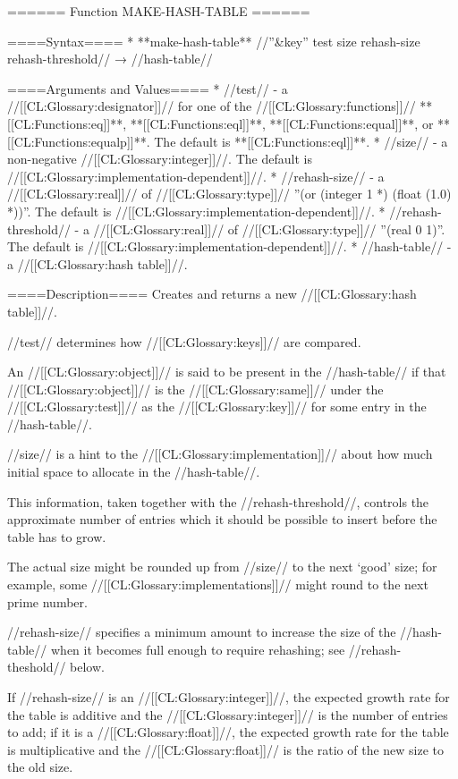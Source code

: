 ====== Function MAKE-HASH-TABLE ======

====Syntax====
  * **make-hash-table** //''&key'' test size rehash-size rehash-threshold// → //hash-table//

====Arguments and Values====
  * //test// - a //[[CL:Glossary:designator]]// for one of the //[[CL:Glossary:functions]]// **[[CL:Functions:eq]]**, **[[CL:Functions:eql]]**, **[[CL:Functions:equal]]**, or **[[CL:Functions:equalp]]**. The default is **[[CL:Functions:eql]]**.
  * //size// - a non-negative //[[CL:Glossary:integer]]//. The default is //[[CL:Glossary:implementation-dependent]]//.
  * //rehash-size// - a //[[CL:Glossary:real]]// of //[[CL:Glossary:type]]// ''(or (integer 1 *) (float (1.0) *))''. The default is //[[CL:Glossary:implementation-dependent]]//.
  * //rehash-threshold// - a //[[CL:Glossary:real]]// of //[[CL:Glossary:type]]// ''(real 0 1)''. The default is //[[CL:Glossary:implementation-dependent]]//.
  * //hash-table// - a //[[CL:Glossary:hash table]]//.

====Description====
Creates and returns a new //[[CL:Glossary:hash table]]//.

//test// determines how //[[CL:Glossary:keys]]// are compared.

An //[[CL:Glossary:object]]// is said to be present in the //hash-table// if that //[[CL:Glossary:object]]// is the //[[CL:Glossary:same]]// under the //[[CL:Glossary:test]]// as the //[[CL:Glossary:key]]// for some entry in the //hash-table//.

//size// is a hint to the //[[CL:Glossary:implementation]]// about how much initial space to allocate in the //hash-table//.

This information, taken together with the //rehash-threshold//, controls the approximate number of entries which it should be possible to insert before the table has to grow.

The actual size might be rounded up from //size// to the next `good' size; for example, some //[[CL:Glossary:implementations]]// might round to the next prime number.

//rehash-size// specifies a minimum amount to increase the size of the //hash-table// when it becomes full enough to require rehashing; see //rehash-theshold// below.

If //rehash-size// is an //[[CL:Glossary:integer]]//, the expected growth rate for the table is additive and the //[[CL:Glossary:integer]]// is the number of entries to add; if it is a //[[CL:Glossary:float]]//, the expected growth rate for the table is multiplicative and the //[[CL:Glossary:float]]// is the ratio of the new size to the old size.

